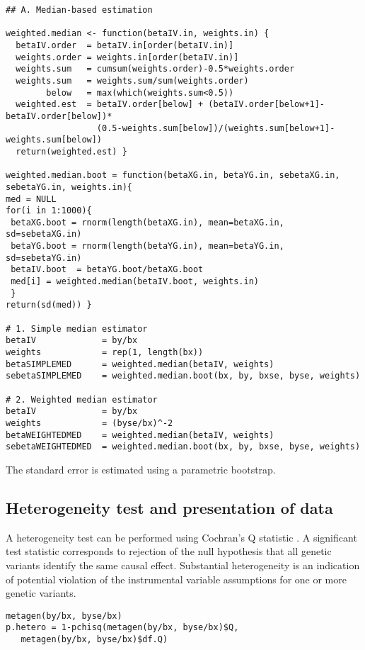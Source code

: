 \documentclass[a4paper,12pt]{article} %
\begin{document}
\begin{lstlisting}
## A. Median-based estimation

weighted.median <- function(betaIV.in, weights.in) {
  betaIV.order  = betaIV.in[order(betaIV.in)]
  weights.order = weights.in[order(betaIV.in)]
  weights.sum   = cumsum(weights.order)-0.5*weights.order
  weights.sum   = weights.sum/sum(weights.order)
        below   = max(which(weights.sum<0.5))
  weighted.est  = betaIV.order[below] + (betaIV.order[below+1]-betaIV.order[below])*
                  (0.5-weights.sum[below])/(weights.sum[below+1]-weights.sum[below])
  return(weighted.est) }

weighted.median.boot = function(betaXG.in, betaYG.in, sebetaXG.in, sebetaYG.in, weights.in){
med = NULL
for(i in 1:1000){
 betaXG.boot = rnorm(length(betaXG.in), mean=betaXG.in, sd=sebetaXG.in)
 betaYG.boot = rnorm(length(betaYG.in), mean=betaYG.in, sd=sebetaYG.in)
 betaIV.boot  = betaYG.boot/betaXG.boot
 med[i] = weighted.median(betaIV.boot, weights.in)
 }
return(sd(med)) }

# 1. Simple median estimator
betaIV             = by/bx
weights            = rep(1, length(bx))
betaSIMPLEMED      = weighted.median(betaIV, weights)
sebetaSIMPLEMED    = weighted.median.boot(bx, by, bxse, byse, weights)

# 2. Weighted median estimator
betaIV             = by/bx
weights            = (byse/bx)^-2
betaWEIGHTEDMED    = weighted.median(betaIV, weights)
sebetaWEIGHTEDMED  = weighted.median.boot(bx, by, bxse, byse, weights)
\end{lstlisting}

The standard error is estimated using a parametric bootstrap.

\clearpage

\subsection{Heterogeneity test and presentation of data}
A heterogeneity test can be performed using Cochran's Q statistic \citep{greco2015}. A significant test statistic corresponds to rejection of the null hypothesis that all genetic variants identify the same causal effect. Substantial heterogeneity is an indication of potential violation of the instrumental variable assumptions for one or more genetic variants.

\begin{lstlisting}
metagen(by/bx, byse/bx)
p.hetero = 1-pchisq(metagen(by/bx, byse/bx)$Q,
   metagen(by/bx, byse/bx)$df.Q)
\end{lstlisting}
\end{document}

